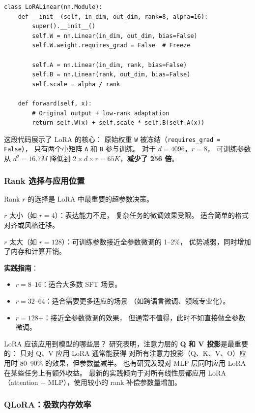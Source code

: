 \begin{lstlisting}[caption={LoRA implementation concept}]
class LoRALinear(nn.Module):
    def __init__(self, in_dim, out_dim, rank=8, alpha=16):
        super().__init__()
        self.W = nn.Linear(in_dim, out_dim, bias=False)
        self.W.weight.requires_grad = False  # Freeze

        self.A = nn.Linear(in_dim, rank, bias=False)
        self.B = nn.Linear(rank, out_dim, bias=False)
        self.scale = alpha / rank

    def forward(self, x):
        # Original output + low-rank adaptation
        return self.W(x) + self.scale * self.B(self.A(x))
\end{lstlisting}

这段代码展示了 LoRA 的核心：
原始权重 \texttt{W} 被冻结（\texttt{requires\_grad = False}），
只有两个小矩阵 \texttt{A} 和 \texttt{B} 参与训练。
对于 $d = 4096$，$r = 8$，
可训练参数从 $d^2 = 16.7M$ 降低到
$2 \times d \times r = 65K$，\textbf{减少了 256 倍}。

\subsubsection{Rank 选择与应用位置}

Rank $r$ 的选择是 LoRA 中最重要的超参数决策。

$r$ 太小（如 $r = 4$）：表达能力不足，
复杂任务的微调效果受限。
适合简单的格式对齐或风格迁移。

$r$ 太大（如 $r = 128$）：可训练参数接近全参数微调的 1--2\%，
优势减弱，同时增加了内存和计算开销。

\textbf{实践指南}：
\begin{itemize}[noitemsep]
  \item $r = 8$--$16$：适合大多数 SFT 场景。
  \item $r = 32$--$64$：适合需要更多适应的场景
       （如跨语言微调、领域专业化）。
  \item $r = 128$+：接近全参数微调的效果，
        但通常不值得，此时不如直接做全参数微调。
\end{itemize}

LoRA 应该应用到模型的哪些层？
研究表明，注意力层的 \textbf{Q 和 V 投影}是最重要的：
只对 Q、V 应用 LoRA 通常能获得
对所有注意力投影（Q、K、V、O）应用时
80--90\% 的效果，但参数量减半。
也有研究发现对 MLP 层同时应用 LoRA
在某些任务上有额外收益。
最新的实践倾向于对所有线性层都应用 LoRA
（attention + MLP），使用较小的 rank 补偿参数量增加。

\subsubsection{QLoRA：极致内存效率}

